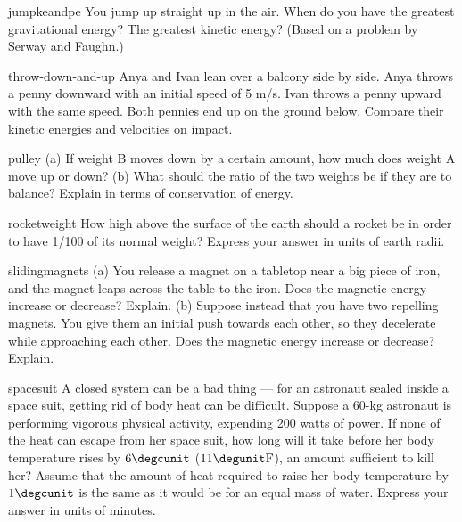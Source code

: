\begin{hwsection}

\begin{hw}{jumpkeandpe}
You jump up straight up in the air. When do you have the greatest
gravitational energy? The greatest kinetic energy?
(Based on a problem by Serway and Faughn.)
\end{hw}

\begin{hw}{throw-down-and-up}
	Anya and Ivan lean over a balcony side by side. Anya throws a penny downward with
	an initial speed of 5 m/s. Ivan throws a penny upward with the same speed. Both pennies
	end up on the ground below. Compare their kinetic energies and velocities on impact.
\end{hw}

\begin{hw}{pulley}
(a) If weight B moves down by a certain amount, how much does weight A
move up or down?\hwendpart
(b) What should the ratio of the two weights be if they are to balance?
Explain in terms of conservation of energy.
\end{hw}

\begin{hw}{rocketweight}
How high above the surface of the earth should a rocket be in order to
have 1/100 of its normal weight? Express your answer in units of earth radii.
\end{hw}

\begin{hw}{slidingmagnets}
	(a) You release a magnet on a tabletop near a big piece
	of iron, and the magnet leaps across the table to the iron.
	Does the magnetic energy increase or decrease?
	Explain.\hwendpart
	(b) Suppose instead that you have two repelling
	magnets. You give them an initial push towards each other,
	so they decelerate while approaching each other. Does the
	magnetic energy increase or decrease? Explain.
\end{hw}

\begin{hw}{spacesuit}
A closed system can be a bad thing --- for an astronaut
sealed inside a space suit, getting rid of body heat can be
difficult. Suppose a 60-kg astronaut is performing vigorous
physical activity, expending 200 watts of power. If none of
the heat can escape from her space suit, how long will it
take before her body temperature rises by $6\degcunit$
($11\degunit\textup{F}$), an amount  sufficient to kill her?  Assume
that the amount of heat required to raise her body
temperature by $1\degcunit$ is the same as it would be for an
equal mass of water. Express your answer in units of minutes.
\end{hw}


\end{hwsection}
